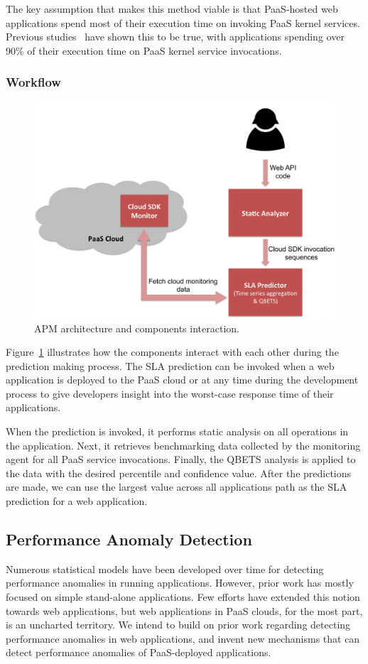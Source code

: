 \documentclass[11pt]{article}
\begin{document}
The key assumption that makes this method viable is that PaaS-hosted web applications spend most of
their execution time on invoking PaaS kernel services. 
Previous studies~\cite{Jayathilaka:2015:RTS:2806777.2806842} have shown this to be true,
with applications spending over 90\% of their execution time on PaaS kernel service invocations.

\subsubsection{Workflow}
\begin{figure}
\centering
\includegraphics[scale=0.35]{apm_flow}
\caption{APM architecture and components interaction.}
\label{fig:apm_flow}
\end{figure}
Figure~\ref{fig:apm_flow} illustrates how the components interact with each other during the prediction making process.
The SLA prediction can be invoked when a web application is deployed to the PaaS cloud or at any time during the development process to give
developers insight into the worst-case response time of their applications.

When the prediction is invoked, it performs static analysis on all operations in the application. Next, it retrieves benchmarking data collected by
the monitoring agent for all PaaS service invocations. Finally, the QBETS analysis is applied to the data with the desired percentile and confidence value.
After the predictions are made, we can use the largest value across all applications path as the SLA prediction for a web application.

\subsection{Performance Anomaly Detection}
Numerous statistical models have been developed over time for detecting performance anomalies in running
applications. However, prior work has mostly focused on simple stand-alone applications. Few efforts have
extended this notion towards web applications, but web applications in PaaS clouds, for the most part,
is an uncharted territory. We intend to build on prior work regarding detecting performance anomalies in
web applications, and invent new mechanisms that can detect performance anomalies of PaaS-deployed
applications.
\end{document}
